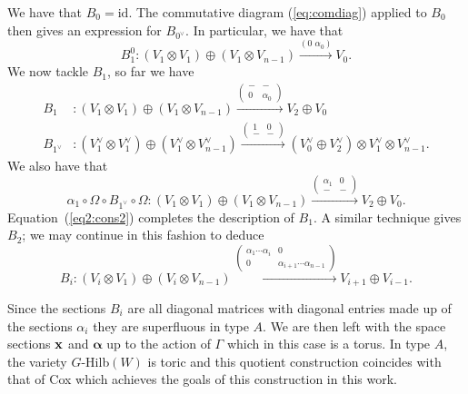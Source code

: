 \documentclass{amsart}
\newcommand{\balpha}{\boldsymbol{\alpha}}
\theoremstyle{definition}
\begin{document}
We have that $B_0 = \text{id}$.
The commutative diagram (\ref{eq:comdiag}) applied to $B_0$ then gives an expression for $B_{0^\vee}$.
In particular, we have that 
$$B_1^0 \colon (V_1 \otimes V_1) \oplus (V_1 \otimes V_{n-1}) \xrightarrow{(0\,\, \alpha_0)} V_0.$$
We now tackle $B_1$, so far we have 
\begin{align*}
    B_1 &\colon (V_1 \otimes V_1) \oplus (V_1 \otimes V_{n-1}) \xrightarrow{\begin{pmatrix} - & - \\ 0 & \alpha_0 \end{pmatrix}} V_2 \oplus V_0 \\
    B_{1^\vee} &\colon (V_1^\vee \otimes V_1^\vee) \oplus (V_1^\vee \otimes V_{n-1}^\vee) \xrightarrow{\begin{pmatrix} 1 & 0 \\ - & - \end{pmatrix}} (V_0^\vee \oplus V_2^\vee) \otimes V_1^\vee \otimes V_{n-1}^\vee.
\end{align*}
We also have that
$$\alpha_1 \circ \Omega \circ B_{1^\vee} \circ \Omega \colon (V_1 \otimes V_1) \oplus (V_1 \otimes V_{n-1}) \xrightarrow{\begin{pmatrix} \alpha_1 & 0 \\ - & - \end{pmatrix}} V_2 \oplus V_0.$$
Equation~(\ref{eq2:cons2}) completes the description of $B_1$.
A similar technique gives $B_2$; we may continue in this fashion to deduce 
$$B_i \colon (V_i \otimes V_1) \oplus (V_i \otimes V_{n-1}) \xrightarrow{\begin{pmatrix} \alpha_1\cdots\alpha_i & 0 \\ 0 & \alpha_{i+1}\cdots\alpha_{n-1} \end{pmatrix}} V_{i+1} \oplus V_{i-1}.$$

Since the sections $B_i$ are all diagonal matrices with diagonal entries made up of the sections $\alpha_i$ they are superfluous in type $A$.
We are then left with the space sections $\mathbf{x}$ and $\balpha$ up to the action of $\Gamma$ which in this case is a torus.
In type $A$, the variety $G$-Hilb$(W)$ is toric and this quotient construction coincides with that of Cox which achieves the goals of this construction in this work.
\end{document}
